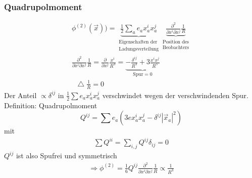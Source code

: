 \documentclass[a4paper]{article}
\newcommand*\laplace{\mathop{}\!\mathbin\bigtriangleup}
\begin{document}
\subsubsection{Quadrupolmoment}
\begin{align}
\phi^{(2)}(\vec{x}))=\underbrace{\frac{1}{2}\sum_a e_a x_a^i
x_a^j}_{\substack{\text{Eigenschaften der}\\\text{Ladungsverteilung}}}
\underbrace{ \frac{\partial^2}{\partial x^i \partial x^j}
\frac{1}{R}}_{\substack{\text{Position des}\\ \text{Beobachters}}}\\
\frac{\partial^2}{\partial x^i \partial x^j} \frac{1}{R}
=\frac{\partial}{\partial x^j} \frac{x^i}{R^3}= \underbrace{
-\frac{\delta^{ij}}{R^3} + 3 \frac{x^ix^j}{R^5}}_{\text{Spur} = 0}\\
\laplace \frac{1}{R}=0
\end{align}
Der Anteil $\propto \delta^{ij}$ in $\frac{1}{2}\sum e_a x_a^i x_a^j$
verschwindet wegen der verschwindenden Spur.\\
Definition: Quadrupolmoment
\begin{equation}
Q^{ij}=\sum e_a \left( 3e x_a^i x_a^j-\delta^{ij} |\vec{x}_a|^2\right)
\end{equation}
mit 
\begin{align}
\sum Q^{ii}=\sum_{i,j} Q^{ij}\delta_{ij}=0
\end{align}
$Q^{ij}$ ist also Spufrei und symmetrisch
\begin{align}
\Rightarrow \phi^{(2)}=\frac{1}{6}Q^{ij} \frac{\partial^2}{\partial x^i
\partial x^j} \frac{1}{R} \propto \frac{1}{R^3}
\end{align}
\end{document}
